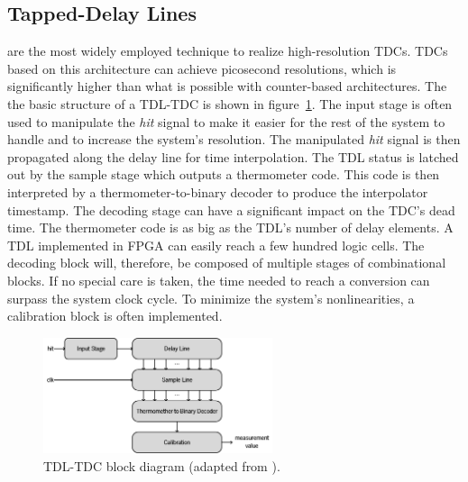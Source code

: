 
\subsection{Tapped-Delay Lines} %
\label{sub:tapped_delay_lines}

 are the most widely employed technique to realize high-resolution \glspl{TDC}. \Glspl{TDC} based on this architecture can achieve picosecond resolutions, which is significantly higher than what is possible with counter-based architectures. The the basic structure of a \gls{TDL}-\gls{TDC} is shown in figure~\ref{fig:tdl_bd}. The input stage is often used to manipulate the \textit{hit} signal to make it easier for the rest of the system to handle and to increase the system's resolution. The manipulated \textit{hit} signal is then propagated along the delay line for time interpolation. The \gls{TDL} status is latched out by the sample stage which outputs a thermometer code. This code is then interpreted by a thermometer-to-binary decoder to produce the interpolator timestamp. The decoding stage can have a significant impact on the \gls{TDC}’s dead time. The thermometer code is as big as the \gls{TDL}’s number of delay elements. A \gls{TDL} implemented in \gls{FPGA} can easily reach a few hundred logic cells. The decoding block will, therefore, be composed of multiple stages of combinational blocks. If no special care is taken, the time needed to reach a conversion can surpass the system clock cycle. To minimize the system’s nonlinearities, a calibration block is often implemented.

\begin{figure}[ht!]
	\centering
	\includegraphics[width=0.6\textwidth]{img/02_StateofArt/tdl_block.png}
	\caption{TDL-TDC block diagram (adapted from \citep{machado_ov}).}
	\label{fig:tdl_bd}
\end{figure}

